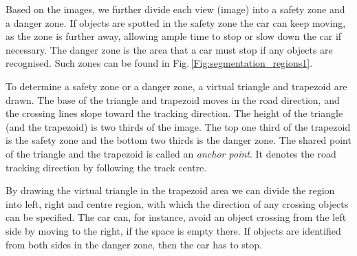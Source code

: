 \documentclass{svproc}
\begin{document}
	Based on the images, we further divide each view (image) into a safety zone and a danger zone. If objects are spotted in the safety zone the car can keep moving, as the zone is further away, allowing ample time to stop or slow down the car if necessary. The danger zone is the area that a car must stop if any objects are recognised. Such zones can be found in Fig.\,\ref{Fig:segmentation_regions1}. 
	
	To determine a safety zone or a danger zone, a virtual triangle and trapezoid are drawn. The base of the triangle and trapezoid moves in the road direction, and the crossing lines slope toward the tracking direction. The height of the triangle (and the trapezoid) is two thirds of the image. The top one third of the trapezoid is the safety zone and the bottom two thirds is the danger zone. The shared point of the triangle and the trapezoid is called an \emph{anchor point}. It denotes the road tracking direction by following the track centre. 
	
	By drawing the virtual triangle in the trapezoid area we can divide the region into left, right and centre region, with which the direction of any crossing objects can be specified. The car can, for instance, avoid an object crossing from the left side by moving to the right, if the space is empty there. If objects are identified from both sides in the danger zone, then the car has to stop. 
	 
\end{document}
